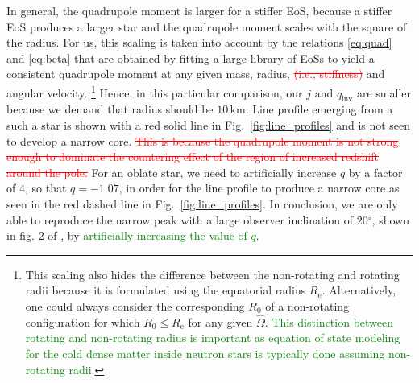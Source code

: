 \documentclass{aa}
\newcommand{\refe}[1]{\textcolor{green}{{#1}}}
\newcommand{\refedel}[1]{\textcolor{red}{\sout{#1}}}
\newcommand{\Ob}{\ensuremath{\hat{\Omega}}}
\newcommand{\Msun}{\ensuremath{M_{\odot}}}
\newcommand{\qinv}{\ensuremath{q_{\mathrm{inv}}}}
\renewcommand{\deg}{\ensuremath{^{\circ}}}
\begin{document}
In general, the quadrupole moment is larger for a stiffer EoS, because a stiffer EoS produces a larger star and the quadrupole moment scales with the square of the radius.
For us, this scaling is taken into account by the relations \eqref{eq:quad} and \eqref{eq:beta} that are obtained by fitting a large library of EoSs \citep[see][]{BBP13, aGM14} to yield a consistent quadrupole moment at any given mass, radius, \refedel{(i.e., stiffness)} and angular velocity.%
\footnote{This scaling also hides the difference between the non-rotating and rotating radii because it is formulated using the equatorial radius $R_{\mathrm{e}}$.
Alternatively, one could always consider the corresponding $R_0$ of a non-rotating configuration for which $R_0 \le R_{\mathrm{e}}$ for any given $\Ob$.
\refe{This distinction between rotating and non-rotating radius is important as equation of state modeling for the cold dense matter inside neutron stars is typically done assuming non-rotating radii.}
}
Hence, in this particular comparison, our $j$ and $\qinv$ are smaller because we demand that radius should be $10\,\mathrm{km}$.
Line profile emerging from a such a star is shown with a red solid line in Fig.~\ref{fig:line_profiles} and is not seen to develop a narrow core. 
\refedel{This is because the quadrupole moment is not strong enough to dominate the countering effect of the region of increased redshift around the pole.}
For an oblate star, we need to artificially increase $q$ by a factor of $4$, so that $q = -1.07$, in order for the line profile to produce a narrow core as seen in the red dashed line in Fig.~\ref{fig:line_profiles}.
In conclusion, we are only able to reproduce the narrow peak with a large observer inclination of $20\deg$, shown in fig. 2 of \citet{BPO13}, by \refe{artificially increasing the value of $q$}. 
\end{document}
